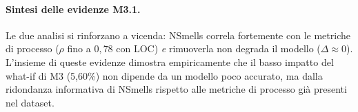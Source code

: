 \paragraph{Sintesi delle evidenze M3.1.}
Le due analisi si rinforzano a vicenda: NSmells correla fortemente con le metriche di
processo ($\rho$ fino a $0{,}78$ con LOC) \textit{e} rimuoverla non degrada il modello
($\Delta \approx 0$). L'insieme di queste evidenze dimostra empiricamente che il basso
impatto del what-if di M3 (5,60\%) non dipende da un modello poco accurato, ma dalla
ridondanza informativa di NSmells rispetto alle metriche di processo già presenti nel
dataset.
